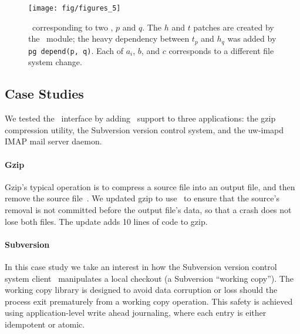 \begin{figure}[t]
\centering
\texttt{[image: fig/figures\_5]}
\caption{\label{fig:opgroup-chdescs} \Chdescs\ corresponding to two
  \opgroups, $p$ and $q$.  The $h$ and $t$ patches are created by the 
  \opgroup\ module; the heavy dependency between $t_p$ and $h_q$ was added
  by \texttt{pg~depend(p, q)}.  Each of $a_i$, $b$, and $c$ corresponds to
  a different file system change.}
\end{figure}

\subsection{Case Studies}
\label{sec:opgroup:casestudies}


We tested the \opgroup\ interface by adding \opgroup\ support to three
applications: the gzip compression utility, the Subversion version control
system, and the uw-imapd IMAP mail server daemon.

\paragraph{Gzip}
\label{sec:opgroup:gzip}

Gzip's typical operation is to compress a source file into an output file,
and then remove the source file~\cite{gzip}.
%
We updated gzip to use \opgroups\ to ensure that the source's removal
is not committed before the output file's data, so that a crash does
not lose both files. The update adds 10 lines of code to gzip.

\paragraph{Subversion}
\label{sec:opgroup:svn}

In this case study we take an interest in how the Subversion version
control system client~\cite{svn} manipulates a local checkout (a
Subversion ``working copy'').
%
The working copy library is designed to avoid data corruption or loss
should the process exit prematurely from a working copy operation.
%
This safety is achieved using application-level write ahead
journaling, where each entry is either idempotent or atomic.

